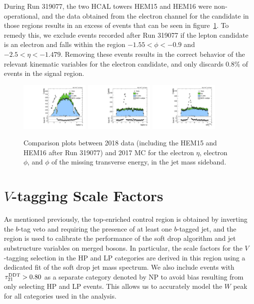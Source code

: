 During Run 319077, the two HCAL towers HEM15 and HEM16 were non-operational, and the data obtained from the electron channel for the \Wtolnu candidate in those regions results in an excess of events that can be seen in figure~\ref{fig:SB_controlPlots2018_electronexcess}. %
To remedy this, we exclude events recorded after Run 319077 if the lepton candidate is an electron and falls within the region $-1.55<\phi<-0.9$ and $-2.5<\eta<-1.479$.
Removing these events results in the correct behavior of the relevant kinematic variables for the electron candidate, and only discards 0.8\% of events in the signal region.

\begin{figure}[htbp]
  \centering
  \includegraphics[width=0.30\textwidth]{fig/analysis/SB_e_2018_lnujj_l1_l_eta.pdf}
  \includegraphics[width=0.30\textwidth]{fig/analysis/SB_e_2018_lnujj_l1_l_phi.pdf}
  \includegraphics[width=0.30\textwidth]{fig/analysis/SB_e_2018_met_phi.pdf}
  \caption{
    Comparison plots between 2018 data (including the HEM15 and HEM16 after Run 319077) and 2017 MC for the electron $\eta$, electron $\phi$, and $\phi$ of the missing transverse energy, in the jet mass sideband.
  }
  \label{fig:SB_controlPlots2018_electronexcess}
\end{figure}

\section{$V$-tagging Scale Factors}
\label{sec:vTag}

As mentioned previously, the top-enriched control region is obtained by inverting the $b$-tag veto and requiring the presence of at least one $b$-tagged jet, and the region is used to calibrate the performance of the soft drop algorithm and jet substructure variables on merged bosons.
In particular, the scale factors for the $V$-tagging selection in the HP and LP categories are derived in this region using a dedicated fit of the soft drop jet mass spectrum.
We also include events with $\tau_{21}^\mathrm{DDT}>0.80$ as a separate category denoted by NP to avoid bias resulting from only selecting HP and LP events.
This allows us to accurately model the $W$ peak for all categories used in the analysis.

